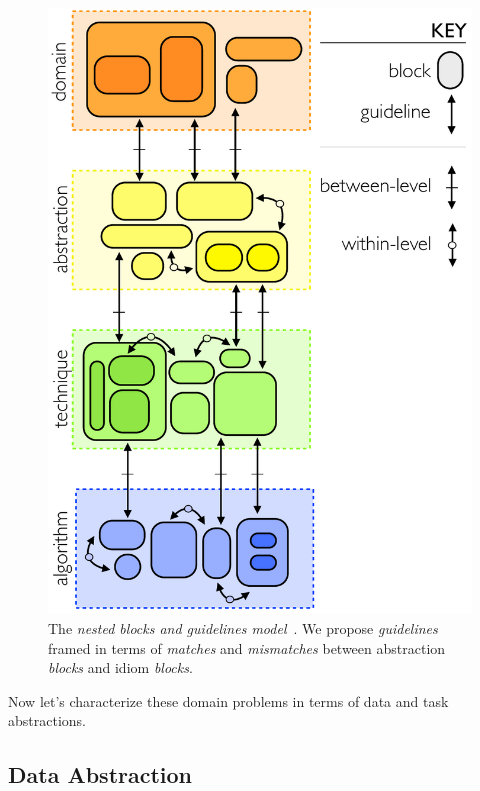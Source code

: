 \documentclass[journal]{vgtc}                %
\begin{document}

\begin{figure}[t]
	\centering
	\includegraphics[width=0.67\columnwidth]{figures/blocks-and-mappings.pdf}
	\vspace{-0.3cm}
	\caption{The \textsl{nested blocks and guidelines model}~\cite{Meyer2013}. We propose \textsl{guidelines} framed in terms of \textsl{matches} and \textsl{mismatches} between abstraction \textsl{blocks} and idiom \textsl{blocks}.}
	\label{fig:nested-model}
	\vspace{-0.6cm}
\end{figure} 

Now let's characterize these domain problems in terms of data and task abstractions.


\subsection{Data Abstraction}
\label{data-abstractions}

\end{document}
